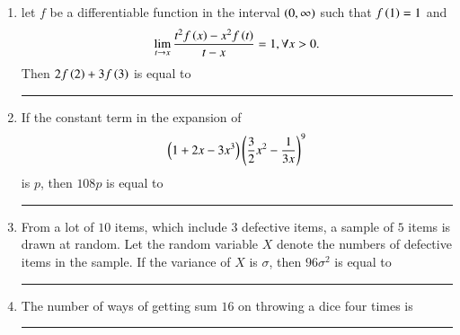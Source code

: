 \documentclass[journal]{IEEEtran}
\numberwithin{equation}{enumi}
\numberwithin{figure}{enumi}
\begin{document}
\begin{enumerate}
    \hfill{}

    \item 
    let $f$ be a differentiable function in the interval $\left(0, \infty\right)$ such that $f\left(1\right) = 1$ and 
    \begin{align*}
        \lim_{t \to x} \frac{t^2f\left(x\right) - x^2f\left(t\right)}{t - x} = 1, \forall x > 0.
    \end{align*}
    Then $2f\left(2\right) + 3f\left(3\right)$ is equal to \rule{1cm}{0.1pt}

    \hfill{}

    \item 
    If the constant term in the expansion of 
    \begin{align*}
        \left(1 + 2x - 3x^3\right)\left(\frac{3}{2}x^2 - \frac{1}{3x}\right)^9 
    \end{align*}
    is $p$, then $108p$ is equal to \rule{1cm}{0.1pt}

    \hfill{}

    \item 
    From a lot of $10$ items, which include $3$ defective items, a sample of $5$ items is drawn at random. Let the random variable $X$ denote the numbers of defective items in the sample. If the variance of $X$ is $\sigma$, then $96\sigma^2$ is equal to \rule{1cm}{0.1pt}

    \hfill{}

    \item 
    The number of ways of getting sum $16$ on throwing a dice four times is \rule{1cm}{0.1pt}

    \hfill{}

\end{enumerate}
\end{document}
